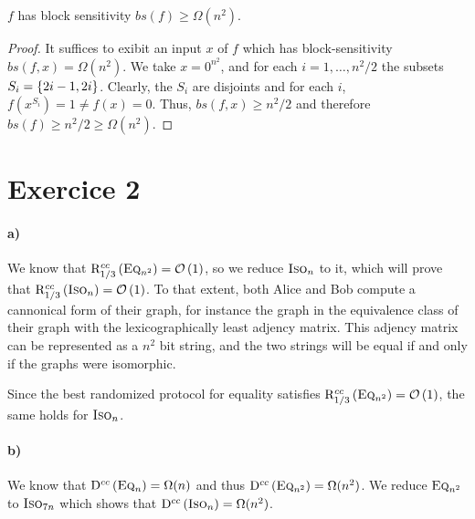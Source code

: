     \begin{claim}
        $f$ has block sensitivity $bs(f) \geq \Omega(n^2)$.
    \end{claim}
    \begin{proof}
        It suffices to exibit an input $x$ of $f$ which has block-sensitivity
        $bs(f, x) = \Omega(n^2)$.
        We take $x = 0^{n^2}$, and for each $i = 1, \dots, n^2/2$
        the subsets $S_i = \left\{ 2i-1, 2i \right\}$.
        Clearly, the $S_i$ are disjoints and for each $i$, $f(x^{S_i}) = 1 \neq f(x) = 0$.
        Thus, $bs(f, x) \geq n^2/2$ and therefore $bs(f) \geq n^2/2 \geq \Omega(n^2)$.
    \end{proof}

    \section*{Exercice 2}
    \paragraph{a)}
    We know that $\mathrm{R}^{cc}_{1/3}\left(\textsc{Eq}_{n^2}\right) = \mathcal{O}\left(1\right)$, so
    we reduce $\textsc{Iso}_n$ to it, which will prove that $\mathrm{R}^{cc}_{1/3}\left(\textsc{Iso}_n\right) = \mathcal{O}\left(1\right)$.
    To that extent, both Alice and Bob compute a cannonical form of their
    graph, for instance the graph in the equivalence class of their graph
    with the lexicographically least adjency matrix. This adjency matrix
    can be represented as a $n^2$ bit string, 
    and the two strings will be equal if and only if the graphs were isomorphic.

    Since the best randomized protocol for equality satisfies 
    $\mathrm{R}^{cc}_{1/3}\left(\textsc{Eq}_{n^2}\right) = \mathcal{O}\left(1\right)$, the same holds for $\textsc{Iso}_n$.

    \paragraph{b)}
    We know that 
    $\mathrm{D}^{cc}\left(\textsc{Eq}_n\right) = \Omega(n)$
    and thus
    $\mathrm{D}^{cc}\left(\textsc{Eq}_{n^2}\right) = \Omega(n^2)$.
    We reduce $\textsc{Eq}_{n^2}$ to $\textsc{Iso}_{7n}$
    which shows that $\mathrm{D}^{cc}\left(\textsc{Iso}_n\right) = \Omega(n^2)$.

